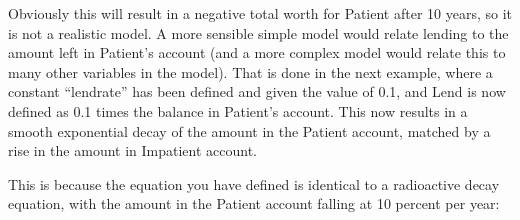 Obviously this will result in a negative total worth for Patient after
10 years, so it is not a realistic model. A more sensible simple model
would relate lending to the amount left in Patient's account (and
a more complex model would relate this to many other variables in
the model). That is done in the next example, where a constant ``lendrate''
has been defined and given the value of 0.1, and Lend is now defined
as 0.1 times the balance in Patient's account. This now results in
a smooth exponential decay of the amount in the Patient account, matched
by a rise in the amount in Impatient account.
\begin{center}
\par\end{center}

This is because the equation you have defined is identical to a radioactive
decay equation, with the amount in the Patient account falling at
10 percent per year:

